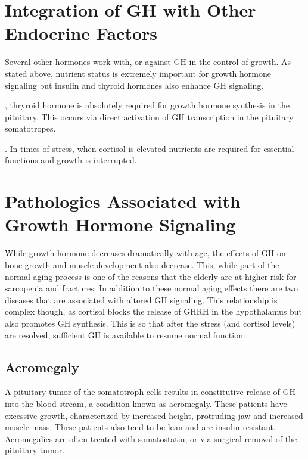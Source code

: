 \documentclass{tufte-handout}
\begin{document}
\section{Integration of GH with Other Endocrine Factors}

Several other hormones work with, or against GH in the control of growth.  As stated above, nutrient status is extremely important for growth hormone signaling but insulin and thyroid hormones also enhance GH signaling.

, thryroid hormone is absolutely required for growth hormone synthesis in the pituitary.  This occurs via direct activation of GH transcription in the pituitary somatotropes.

.  In times of stress, when cortisol is elevated nutrients are required for essential functions and growth is interrupted.  

\section{Pathologies Associated with Growth Hormone Signaling}

While growth hormone decreases dramatically with age, the effects of GH on bone growth and muscle development also decrease.  This, while part of the normal aging process is one of the reasons that the elderly are at higher risk for sarcopenia and fractures.  In addition to these normal aging effects there are two diseases that are associated with altered GH signaling.  This relationship is complex though, as cortisol blocks the release of GHRH in the hypothalamus but also promotes GH synthesis.  This is so that after the stress (and cortisol levels) are resolved, sufficient GH is available to resume normal function.

\subsection{Acromegaly}

A pituitary tumor of the somatotroph cells results in constitutive release of GH into the blood stream, a condition known as acromegaly.  These patients have excessive growth, characterized by increased height, protruding jaw and increased muscle mass.  These patients also tend to be lean and are insulin resistant.  Acromegalics are often treated with somatostatin, or via surgical removal of the pituitary tumor.
\end{document}
